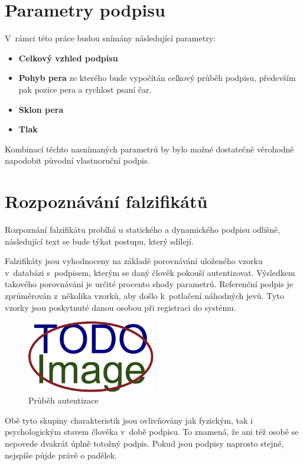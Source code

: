 \newpage

\section{Parametry podpisu}
V~rámci této práce budou snímány následující parametry:
\begin{itemize}
  \item \textbf{Celkový vzhled podpisu}
  \item \textbf{Pohyb pera} ze kterého bude vypočítán celkový průběh podpisu, především pak pozice pera a rychlost psaní čar. %
  \item \textbf{Sklon pera} %
  \item \textbf{Tlak} %
\end{itemize}
Kombinací těchto nasnímaných parametrů by bylo možné dostatečně věrohodně napodobit původní vlastnoruční podpis. 

\section{Rozpoznávání falzifikátů}
Rozpoznání falzifikátu probíhá u statického a dynamického podpisu odlišně, následující text se bude týkat postupu, který sdílejí.

Falzifikáty jsou vyhodnoceny na základě porovnávání uloženého vzorku v~databázi s~podpisem, kterým se daný člověk pokouší autentizovat.
Výsledkem takového porovnávání je určité procento shody parametrů.
Referenční podpis je zprůměrován z~několika vzorků, aby došlo k~potlačení náhodných jevů. %
Tyto vzorky jsou poskytnuté danou osobou při registraci do systému.

\begin{figure}[h]\label{fig:my-pdf}
  \centering
  \includegraphics[width=0.5\textwidth]{obrazky-figures/placeholder.pdf}
  \caption{Průběh autentizace}
\end{figure}

Obě tyto skupiny charakteristik jsou ovlivňovány jak fyzickým, tak i psychologickým stavem člověka v~době podpisu.
To znamená, že ani též osobě se nepovede dvakrát úplně totožný podpis.
Pokud jsou podpisy naprosto stejné, nejspíše půjde právě o padělek.

